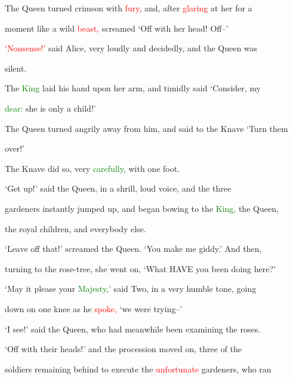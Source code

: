  The Queen turned crimson with \textcolor{red}{fury,} and, after \textcolor{red}{glaring} at her for a

 moment like a \textcolor{BurntOrange}{wild} \textcolor{red}{beast,} \textcolor{BurntOrange}{screamed} ‘Off with her head! Off--’



 \textcolor{red}{‘Nonsense!’} said Alice, very loudly and decidedly, and the Queen was

 silent.



 The \textcolor{green}{King} laid his hand upon her arm, and timidly said ‘Consider, my

 \textcolor{green}{dear:} she is only a \textcolor{BurntOrange}{child!’}



 The Queen turned angrily away from him, and said to the Knave ‘Turn them

 over!’



 The Knave did so, very \textcolor{green}{carefully,} with one foot.



 ‘Get up!’ said the Queen, in a \textcolor{BurntOrange}{shrill,} loud voice, and the three

 gardeners instantly jumped up, and began bowing to the \textcolor{green}{King,} the Queen,

 the royal \textcolor{BurntOrange}{children,} and everybody else.



 \textcolor{BurntOrange}{‘Leave} off that!’ \textcolor{BurntOrange}{screamed} the Queen. ‘You make me giddy.’ And then,

 turning to the rose-tree, she went on, ‘What HAVE you been doing here?’



 ‘May it please your \textcolor{green}{Majesty,’} said Two, in a very \textcolor{BurntOrange}{humble} tone, going

 down on one knee as he \textcolor{red}{spoke,} ‘we were trying--’



 ‘I see!’ said the Queen, who had meanwhile been examining the roses.

 ‘Off with their heads!’ and the \textcolor{BurntOrange}{procession} moved on, three of the

 \textcolor{BurntOrange}{soldiers} remaining behind to execute the \textcolor{red}{unfortunate} gardeners, who ran


